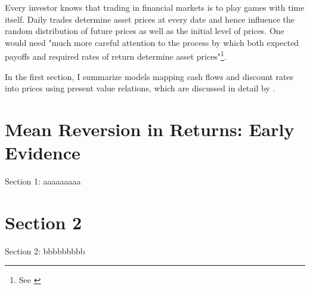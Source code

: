 \minitoc

\vspace{0.5cm}
Every investor knows that trading in financial markets is to play
games with time itself. Daily trades determine asset prices at every date and hence
influence the random distribution of future prices as well as the initial
level of prices. One would need "much more careful attention to the process
by which both expected payoffs and required rates of return determine
asset prices"\footnote{See \cite[p.~121]{campbell2017financial}}.

In the first section, I summarize models mapping cash flows and discount rates
into prices using present value relations, which are discussed in detail by
\citet[Chapter~5]{campbell2017financial}.

\section{Mean Reversion in Returns: Early Evidence}
Section 1: aaaaaaaaa

\section{Section 2}
Section 2: bbbbbbbbb